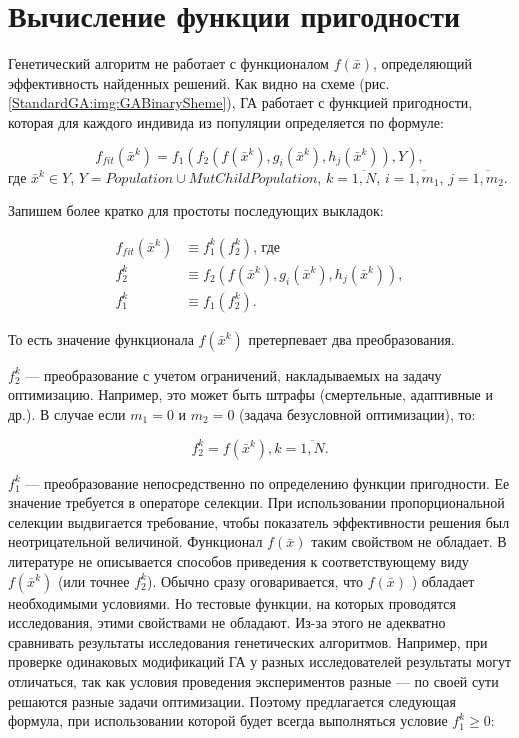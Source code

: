 \section{Вычисление функции пригодности} \label{StandardGA:subsection_fit}

Генетический алгоритм не работает с функционалом $ f\left(\bar{x} \right)  $, определяющий эффективность найденных решений. Как видно на схеме (рис. \ref{StandardGA:img:GABinarySheme}), ГА работает с функцией пригодности, которая для каждого индивида из популяции определяется по формуле:

\begin{equation}
\label{StandardGA:eq:fit}
f_{fit}\left( \bar{x}^k\right) = f_1 \left( f_2 \left( f\left( \bar{x}^k\right),g_i\left( \bar{x}^k\right),h_j\left( \bar{x}^k\right)\right),Y \right), 
\end{equation}
\indent где $\bar{x}^k \in Y$, $Y=Population \cup MutChildPopulation$, $k=\overline{1,N}$, $i=\overline{1,m_1}$, $j=\overline{1,m_2}$.

Запишем более кратко для простоты последующих выкладок:

\begin{align}
\label{StandardGA:eq:fitshort}
f_{fit}\left( \bar{x}^k\right) &\equiv f_1^k\left( f_2^k\right) \text{, где }\\
f_2^k&\equiv f_2 \left( f\left( \bar{x}^k\right),g_i\left( \bar{x}^k\right),h_j\left( \bar{x}^k\right)\right), \nonumber\\
f_1^k &\equiv f_1\left(f_2^k \right)\nonumber.
\end{align}

То есть значение функционала $ f\left( \bar{x}^k\right) $ претерпевает два преобразования.

$ f_2^k $ --- преобразование с учетом ограничений, накладываемых на задачу оптимизацию. Например, это может быть штрафы (смертельные, адаптивные и др.). В случае если $ m_1=0 $ и $ m_2=0 $ (задача безусловной оптимизации), то:

\begin{equation}
\label{StandardGA:eq:f_2^k}
f_2^k=f\left( \bar{x}^k\right), k=\overline{1,N}.
\end{equation}

$ f_1^k $ --- преобразование непосредственно по определению функции пригодности. Ее значение требуется в операторе селекции. При использовании пропорциональной селекции выдвигается требование, чтобы показатель эффективности решения был неотрицательной величиной. Функционал $f\left( \bar{x}\right)$ таким свойством не обладает. В литературе не описывается способов приведения к соответствующему виду $f\left( \bar{x}^k\right)$ (или точнее $ f_2^k $). Обычно сразу оговаривается, что $f\left( \bar{x}\right)$ ) обладает необходимыми условиями. Но тестовые функции, на которых проводятся исследования, этими свойствами не обладают. Из-за этого не адекватно сравнивать результаты исследования генетических алгоритмов. Например, при проверке одинаковых модификаций ГА у разных исследователей результаты могут отличаться, так как условия проведения экспериментов разные --- по своей сути решаются разные задачи оптимизации. Поэтому предлагается следующая формула, при использовании которой будет всегда выполняться условие $ f_1^k\geq 0 $:

